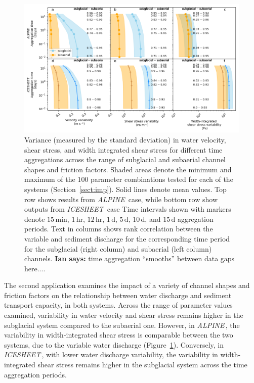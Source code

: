 \documentclass[11pt]{article}
\newcommand{\ian}[1]{{\textbf{\color{blue}Ian says:} \color{blue} #1} }
\newcommand{\alpine}{\textit{ALPINE}\,}
\newcommand{\icesheet}{\textit{ICESHEET}\,}
\newcommand{\unit}[1]{$\mathrm{#1}$}
\begin{document}
\begin{figure}[h]
  \centering
    \includegraphics[width=0.9\linewidth]{Fig4.png}
    \caption{Variance (measured by the standard deviation) in water velocity, shear stress, and width integrated shear stress for different time aggregations across the range of subglacial and subaerial channel shapes and friction factors.
      Shaded areas denote the minimum and maximum of the $100$ parameter combinations tested for each of the systems (Section~\ref{sect:imp}).
      Solid lines denote  mean values.
      Top row shows results from \alpine{} case, while bottom row show outputs from \icesheet{} case
      Time intervals shown with markers denote $15$\,\unit{min}, $1$\,\unit{hr}, $12$\,\unit{hr}, $1$\,\unit{d}, $5$\,\unit{d}, $10$\,\unit{d}, and $15$\,\unit{d} aggregation periods.
      Text in columns shows rank correlation between the variable and sediment discharge for the corresponding time period for the subglacial (right column) and subaerial (left column) channels.
      \ian{time aggregation ``smooths'' between data gaps here....}
    }
    \label{fig:multi_run}
  \end{figure}

The second application examines the impact of a variety of channel shapes and friction factors on the relationship between water discharge and sediment transport capacity, in both systems.
Across the range of parameter values examined, variability in water velocity and shear stress remains higher in the subglacial system compared to the subaerial one.
However, in \alpine{}, the variability in width-integrated shear stress is comparable between the two systems, due to the variable water discharge (Figure~\ref{fig:multi_run}).
Conversely, in \icesheet{}, with lower water discharge variability, the variability in width-integrated shear stress remains higher in the subglacial system across the time aggregation periods.
\end{document}
